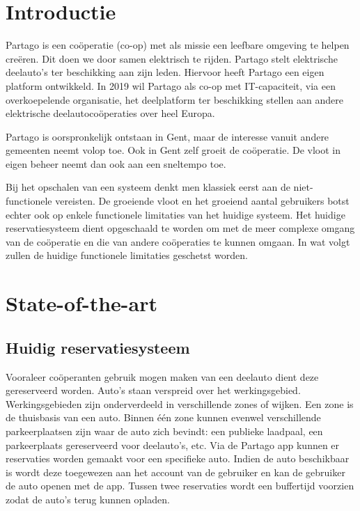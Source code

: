\section{Introductie} %
\label{sec:introductie}
Partago is een coöperatie (co-op) met als missie een leefbare omgeving te helpen creëren. Dit doen we door samen elektrisch te rijden. Partago stelt elektrische deelauto's ter beschikking aan zijn leden. Hiervoor heeft Partago een eigen platform ontwikkeld. In 2019 wil Partago als co-op met IT-capaciteit, via een overkoepelende organisatie, het deelplatform ter beschikking stellen aan andere elektrische deelautocoöperaties over heel Europa.

Partago is oorspronkelijk ontstaan in Gent, maar de interesse vanuit andere gemeenten neemt volop toe. Ook in Gent zelf groeit de coöperatie. De vloot in eigen beheer neemt dan ook aan een sneltempo toe. 

Bij het opschalen van een systeem denkt men klassiek eerst aan de niet-functionele vereisten. De groeiende vloot en het groeiend aantal gebruikers botst echter ook op enkele functionele limitaties van het huidige systeem. Het huidige reservatiesysteem dient opgeschaald te worden om met de meer complexe omgang van de coöperatie en die van andere coöperaties te kunnen omgaan. In wat volgt zullen de huidige functionele limitaties geschetst worden. 


\section{State-of-the-art}
\label{sec:state-of-the-art}
\subsection{Huidig reservatiesysteem}
Vooraleer coöperanten gebruik mogen maken van een deelauto dient deze gereserveerd worden. Auto's staan verspreid over het werkingsgebied. Werkingsgebieden zijn onderverdeeld in verschillende zones of wijken. Een zone is de thuisbasis van een auto. Binnen één zone kunnen evenwel verschillende parkeerplaatsen zijn waar de auto zich bevindt: een publieke laadpaal, een parkeerplaats gereserveerd voor deelauto's, etc. Via de Partago app kunnen er reservaties worden gemaakt voor een specifieke auto. Indien de auto beschikbaar is wordt deze toegewezen aan het account van de gebruiker en kan de gebruiker de auto openen met de app. Tussen twee reservaties wordt een buffertijd voorzien zodat de auto's terug kunnen opladen.   

